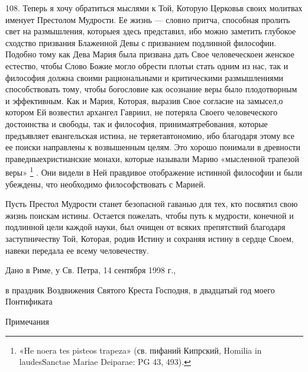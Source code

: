 \documentclass[a5paper,10pt]{article}
\begin{document}
108. Теперь я хочу обратиться мыслями к Той, Которую Церковьв своих молитвах
именует Престолом Мудрости. Ее жизнь — словно притча, способная пролить свет на
размышления, которыея здесь представил, ибо можно заметить глубокое сходство
призвания Блаженной Девы с призванием подлинной философии. Подобно тому как
Дева Мария была призвана дать Свое человеческоеи женское естество, чтобы Слово
Божие могло обрести плотьи стать одним из нас, так и философия должна своими
рациональными и критическими размышлениями способствовать тому, чтобы
богословие как осознание веры было плодотворным и эффективным. Как и Мария,
Которая, выразив Свое согласие на замысел,о котором Ей возвестил архангел
Гавриил, не потеряла Своего человеческого достоинства и свободы, так и
философия, принимаятребования, которые предъявляет евангельская истина, не
теряетавтономию, ибо благодаря этому все ее поиски направлены к возвышенным
целям. Это хорошо понимали в древности праведныехристианские монахи, которые
называли Марию «мысленной трапезой веры» \footnote{«He noera tes pisteos
trapeza» (св. пифаний Кипрский, Homilia in laudesSanctae Mariae Deiparae: PG
43, 493).} . Они видели в Ней правдивое отображение истинной философии и были
убеждены, что необходимо философствовать с Марией.

Пусть Престол Мудрости станет безопасной гаванью для тех, кто посвятил свою
жизнь поискам истины. Остается пожелать, чтобы путь к мудрости, конечной и
подлинной цели каждой науки, был очищен от всяких препятствий благодаря
заступничеству Той, Которая, родив Истину и сохраняя истину в сердце Своем,
навеки передала ее всему человечеству.

Дано в Риме, у Св. Петра, 14 сентября 1998 г.,

в праздник Воздвижения Святого Креста Господня, в двадцатый год моего
Понтификата

Примечания
\end{document}
